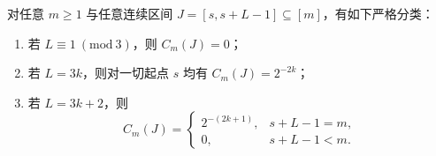 \begin{theorem}[连续区间偶奇相关的完全分类]\label{thm:fold-fiber-parity-energy-simplex-interval-correlation-classification}
对任意 \(m\ge 1\) 与任意连续区间 \(J=[s,s+L-1]\subseteq[m]\)，有如下严格分类：
\begin{enumerate}
  \item 若 \(L\equiv 1\ (\mathrm{mod}\ 3)\)，则 \(C_m(J)=0\)；
  \item 若 \(L=3k\)，则对一切起点 \(s\) 均有 \(C_m(J)=2^{-2k}\)；
  \item 若 \(L=3k+2\)，则
  \[
  C_m(J)=
  \begin{cases}
  2^{-(2k+1)}, & s+L-1=m,\\[4pt]
  0, & s+L-1<m.
  \end{cases}
  \]
\end{enumerate}
\end{theorem}
